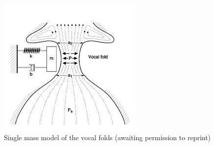 \documentclass[12pt, letter]{report}
\begin{document}
\begin{figure}
\centering
\includegraphics[width=0.5\linewidth]{vocal_folds_spring.png}
\caption{Single mass model of the vocal folds (awaiting permission to reprint)}
\label{fig:vocal_folds_spring}
\end{figure}
\end{document}
